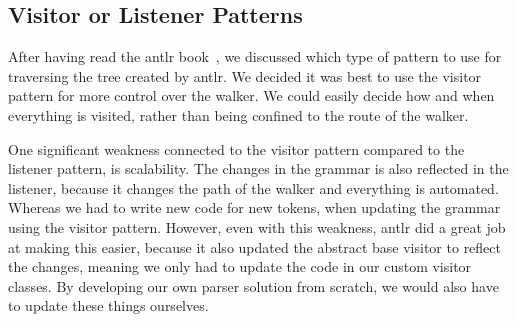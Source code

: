 \subsection{Visitor or Listener Patterns}

After having read the \gls{antlr} book~\cite{Parr2014}, we discussed which type of pattern to use for traversing the tree created by \gls{antlr}. We decided it was best to use the visitor pattern for more control over the walker. We could easily decide how and when everything is visited, rather than being confined to the route of the walker.

One significant weakness connected to the visitor pattern compared to the listener pattern, is scalability. The changes in the grammar is also reflected in the listener, because it changes the path of the walker and everything is automated. Whereas we had to write new code for new tokens, when updating the grammar using the visitor pattern. However, even with this weakness, \gls{antlr} did a great job at making this easier, because it also updated the abstract base visitor to reflect the changes, meaning we only had to update the code in our custom visitor classes. By developing our own parser solution from scratch, we would also have to update these things ourselves.